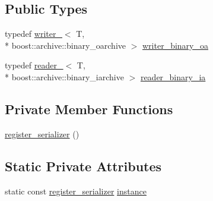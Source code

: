 \subsection*{Public Types}
\begin{DoxyCompactItemize}
\item 
typedef \hyperlink{structecto_1_1serialization_1_1writer__}{writer\-\_\-}$<$ T, \\*
boost\-::archive\-::binary\-\_\-oarchive $>$ \hyperlink{structecto_1_1serialization_1_1register__serializer_a31c9f04624076aa209e66232a511c627}{writer\-\_\-binary\-\_\-oa}
\item 
typedef \hyperlink{structecto_1_1serialization_1_1reader__}{reader\-\_\-}$<$ T, \\*
boost\-::archive\-::binary\-\_\-iarchive $>$ \hyperlink{structecto_1_1serialization_1_1register__serializer_a7783674d19bdb5a7f2143953d6a7302f}{reader\-\_\-binary\-\_\-ia}
\end{DoxyCompactItemize}
\subsection*{Private Member Functions}
\begin{DoxyCompactItemize}
\item 
\hyperlink{structecto_1_1serialization_1_1register__serializer_ae339eb881e0afbb36bff03a34263c683}{register\-\_\-serializer} ()
\end{DoxyCompactItemize}
\subsection*{Static Private Attributes}
\begin{DoxyCompactItemize}
\item 
static const \hyperlink{structecto_1_1serialization_1_1register__serializer}{register\-\_\-serializer} \hyperlink{structecto_1_1serialization_1_1register__serializer_a742ed82697621237f599631009e47e05}{instance}
\end{DoxyCompactItemize}


